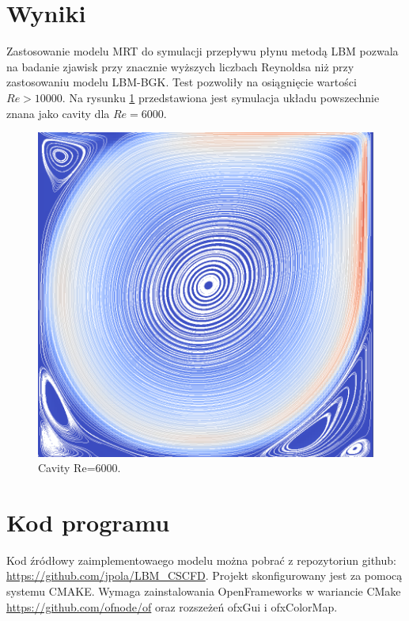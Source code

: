 \documentclass[a4paper,11pt,twoside]{article}
\begin{document}
\section{Wyniki}
Zastosowanie modelu MRT do symulacji przepływu płynu metodą LBM pozwala na badanie zjawisk przy znacznie wyższych liczbach Reynoldsa niż przy zastosowaniu modelu LBM-BGK. Test pozwoliły na osiągnięcie wartości $Re>10000$. Na rysunku \ref{MRT1} przedstawiona jest symulacja układu powszechnie znana jako cavity dla $Re=6000$. 
\begin{figure}[h]
\begin{center}
\includegraphics[width=0.75\linewidth]{images/6000.png}
\caption{Cavity Re=6000.}
\label{MRT1}
\end{center}
\end{figure}

\section{Kod programu}
Kod źródłowy zaimplementowaego modelu można pobrać z repozytoriun github: \url{https://github.com/jpola/LBM_CSCFD}. Projekt skonfigurowany jest za pomocą systemu CMAKE. Wymaga zainstalowania OpenFrameworks w wariancie CMake \url{https://github.com/ofnode/of} oraz rozszeżeń ofxGui i ofxColorMap.

\newpage


\end{document}
